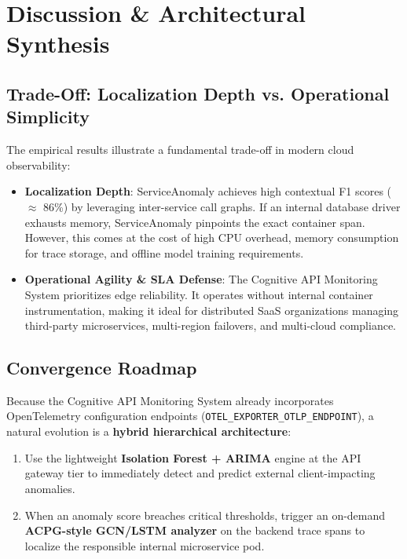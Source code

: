 \documentclass[11pt,a4paper]{article}
\begin{document}
\section{Discussion \& Architectural Synthesis}

\subsection{Trade-Off: Localization Depth vs. Operational Simplicity}
The empirical results illustrate a fundamental trade-off in modern cloud observability:
\begin{itemize}[leftmargin=*]
    \item \textbf{Localization Depth}: ServiceAnomaly achieves high contextual F1 scores ($\approx$ 86\%) by leveraging inter-service call graphs. If an internal database driver exhausts memory, ServiceAnomaly pinpoints the exact container span. However, this comes at the cost of high CPU overhead, memory consumption for trace storage, and offline model training requirements.
    \item \textbf{Operational Agility \& SLA Defense}: The Cognitive API Monitoring System prioritizes edge reliability. It operates without internal container instrumentation, making it ideal for distributed SaaS organizations managing third-party microservices, multi-region failovers, and multi-cloud compliance.
\end{itemize}

\subsection{Convergence Roadmap}
Because the Cognitive API Monitoring System already incorporates OpenTelemetry configuration endpoints (\texttt{OTEL\_EXPORTER\_OTLP\_ENDPOINT}), a natural evolution is a \textbf{hybrid hierarchical architecture}:
\begin{enumerate}
    \item Use the lightweight \textbf{Isolation Forest + ARIMA} engine at the API gateway tier to immediately detect and predict external client-impacting anomalies.
    \item When an anomaly score breaches critical thresholds, trigger an on-demand \textbf{ACPG-style GCN/LSTM analyzer} on the backend trace spans to localize the responsible internal microservice pod.
\end{enumerate}
\end{document}
